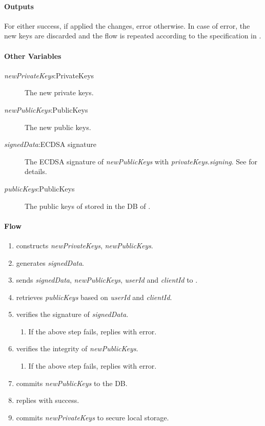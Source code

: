 \documentclass[a4paper,10pt,draft]{article}
\newcommand{\signedData}{\emph{signedData}}
\newcommand{\newPublicKeys}{\emph{newPublicKeys}}
\newcommand{\newPrivateKeys}{\emph{newPrivateKeys}}
\newcommand{\privateKeys}{\emph{privateKeys}}
\newcommand{\publicKeys}{\emph{publicKeys}}
\newcommand{\signingKey}{\privateKeys{}.\emph{signing}}
\newcommand{\userId}{\emph{userId}}
\newcommand{\clientId}{\emph{clientId}}
\begin{document}
\paragraph{Outputs}
For \Client{} either success, if \Server{} applied the changes, error otherwise. In case of error, the new keys are discarded and the flow is repeated according to the 
specification in \cite{crypto_spec}.

\paragraph{Other Variables}
\SpecialItem
\begin{description}
 \item[\newPrivateKeys{}:PrivateKeys] The new private keys.
 \item[\newPublicKeys{}:PublicKeys] The new public keys.
 \item[\signedData{}:ECDSA signature] The ECDSA signature of \newPublicKeys{} with \signingKey{}. See \cite{crypto_spec} for details.
 \item[\publicKeys{}:PublicKeys] The public keys of \Client{} stored in the DB of \Server{}.
\end{description}

\paragraph{Flow}

\begin{enumerate}
 \item \Client{} constructs \newPrivateKeys{}, \newPublicKeys{}.
 \item \Client{} generates \signedData{}.
 \item \Client{} sends \signedData{}, \newPublicKeys{}, \userId{} and \clientId{} to \Server{}.
 \item \Server{} retrieves \publicKeys{} based on \userId{} and \clientId{}.
 \item \Server{} verifies the signature of \signedData{}.
 \begin{enumerate}
  \item If the above step fails, \Server{} replies with error.
 \end{enumerate}
 \item \Server{} verifies the integrity of \newPublicKeys{}.
 \begin{enumerate}
  \item If the above step fails, \Server{} replies with error.
 \end{enumerate}
 \item \Server{} commits \newPublicKeys{} to the DB.
 \item \Server{} replies with success.
 \item\label{modify_keys_flow:local_storage} \Client{} commits \newPrivateKeys{} to secure local storage.
\end{enumerate}
\end{document}
